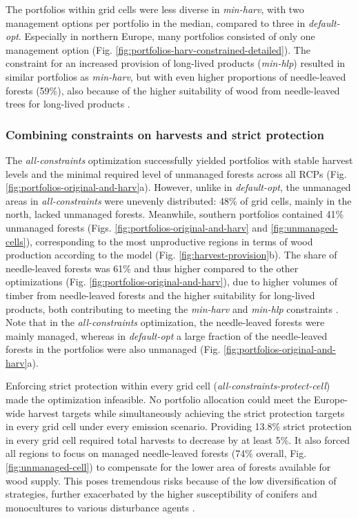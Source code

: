 \documentclass[]{article}
\begin{document}
The portfolios within grid cells were less diverse in \textit{min-harv}, with two management options per portfolio in the median, compared to three in \textit{default-opt}. Especially in northern Europe, many portfolios consisted of only one management option (Fig. \ref{fig:portfolios-harv-constrained-detailed}).
The constraint for an increased provision of long-lived products (\textit{min-hlp}) resulted in similar portfolios as \textit{min-harv}, but with even higher proportions of needle-leaved forests (59\%), also because of the higher suitability of wood from needle-leaved trees for long-lived products \parencite{EUROSTAT2023a}.






\subsubsection{Combining constraints on harvests and strict protection}

The \textit{all-constraints} optimization successfully yielded portfolios with stable harvest levels and the minimal required level of unmanaged forests across all RCPs (Fig. \ref{fig:portfolios-original-and-harv}a).
However, unlike in \textit{default-opt}, the unmanaged areas in \textit{all-constraints} were unevenly distributed: 48\% of grid cells, mainly in the north, lacked unmanaged forests. Meanwhile, southern portfolios contained 41\% unmanaged forests (Figs. \ref{fig:portfolios-original-and-harv} and \ref{fig:unmanaged-cells}), corresponding to the most unproductive regions in terms of wood production according to the model (Fig. \ref{fig:harvest-provision}b).
The share of needle-leaved forests was 61\% and thus higher compared to the other optimizations (Fig. \ref{fig:portfolios-original-and-harv}), due to higher volumes of timber from needle-leaved forests and the higher suitability for long-lived products, both contributing to meeting the \textit{min-harv} and \textit{min-hlp} constraints \parencite{EUROSTAT2023a}. Note that in the \textit{all-constraints} optimization, the needle-leaved forests were mainly managed, whereas in \textit{default-opt} a large fraction of the needle-leaved forests in the portfolios were also unmanaged (Fig. \ref{fig:portfolios-original-and-harv}a).

Enforcing strict protection within every grid cell (\textit{all-constraints-protect-cell}) made the optimization infeasible. No portfolio allocation could meet the Europe-wide harvest targets while simultaneously achieving the strict protection targets in every grid cell under every emission scenario. Providing 13.8\% strict protection in every grid cell required total harvests to decrease by at least 5\%. It also forced all regions to focus on managed needle-leaved forests (74\% overall, Fig. \ref{fig:unmanaged-cell}) to compensate for the lower area of forests available for wood supply. This poses tremendous risks because of the low diversification of strategies, further exacerbated by the higher susceptibility of conifers and monocultures to various disturbance agents \parencite{SCHELHAAS2010, HLASNY2021, PARDOS2021}.
\end{document}
